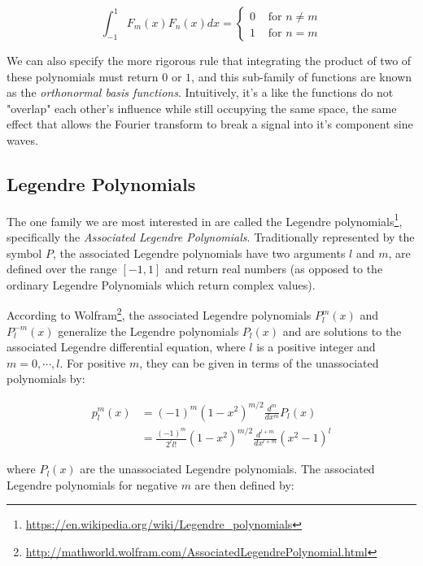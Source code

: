 \begin{equation*}
	\int_{-1}^{1}F_m(x)F_n(x)dx=\begin{cases}
		0 & \text{ for } n\neq m\\
		1 & \text{ for } n=m
	\end{cases}
\end{equation*}

We can also specify the more rigorous rule that integrating the product of two of these polynomials must return $0$ or $1$, and this sub-family of functions are known as the \textit{orthonormal basis functions}. Intuitively, it's a like the functions do not "overlap" each other's influence while still occupying the same space, the same effect that allows the Fourier transform to break a signal into it's component sine waves.



\subsection{Legendre Polynomials}
The one family we are most interested in are called the Legendre polynomials\footnote{\url{https://en.wikipedia.org/wiki/Legendre_polynomials}}, specifically the \textit{Associated Legendre Polynomials}. Traditionally represented by the symbol $P$, the associated Legendre polynomials have two arguments $l$ and $m$, are defined over the range $[-1,1]$ and return real numbers (as opposed to the ordinary Legendre Polynomials which return complex values).

According to Wolfram\footnote{\url{http://mathworld.wolfram.com/AssociatedLegendrePolynomial.html}}, the associated Legendre polynomials $P^{m}_{l}(x)$ and $P^{-m}_{l}(x)$ generalize the Legendre polynomials $P_l(x)$ and are solutions to the associated Legendre differential equation, where $l$ is a positive integer and $m=0,\cdots,l$. For positive $m$, they can be given in terms of the unassociated polynomials by:

\begin{equation*}
\begin{aligned}
	p^{m}_{l}(x)&=(-1)^{m}(1-x^{2})^{m/2}\frac{d^{m}}{dx^{m}}P_l(x)\\
	&=\frac{(-1)^{m}}{2^{l}l!}(1-x^{2})^{m/2}\frac{d^{l+m}}{dx^{l+m}}(x^{2}-1)^{l}
\end{aligned}
\end{equation*}

where $P_l(x)$ are the unassociated Legendre polynomials. The associated Legendre polynomials for negative $m$ are then defined by:


